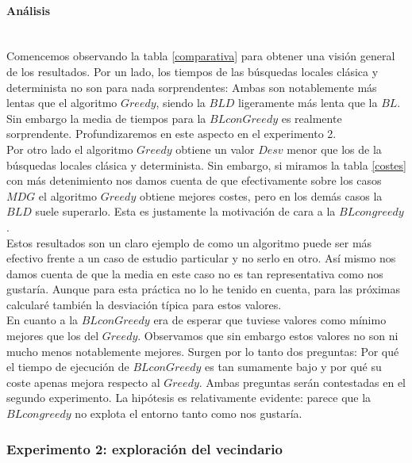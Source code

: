 \documentclass[11pt,a4paper]{article}
\begin{document}
	\paragraph{ Análisis } \ \\
	
	Comencemos observando la tabla \ref{comparativa} para obtener una visión general de los resultados. Por un lado, los tiempos de las búsquedas locales clásica y determinista no son para nada sorprendentes: Ambas son notablemente más lentas que el algoritmo $Greedy$, siendo la $BLD$ ligeramente más lenta que la $BL$. Sin embargo la media de tiempos para la $BL con Greedy$ es realmente sorprendente. Profundizaremos en este aspecto en el experimento 2.  \\
	
	Por otro lado el algoritmo $Greedy$ obtiene un valor $Desv$ menor que los de la búsquedas locales clásica y determinista. Sin embargo, si miramos la tabla \ref{costes} con más detenimiento nos damos cuenta de que efectivamente sobre los casos $MDG$ el algoritmo $Greedy$ obtiene mejores costes, pero en los demás casos la $BLD$ suele superarlo. Esta es justamente la motivación de cara a la $BL con greedy$. \\
	
	 Estos resultados son un claro ejemplo de como un algoritmo puede ser más efectivo frente a un caso de estudio particular y no serlo en otro. Así mismo nos damos cuenta de que la media en este caso no es tan representativa como nos gustaría. Aunque para esta práctica no lo he tenido en cuenta, para las próximas calcularé también la desviación típica para estos valores. \\ 
	
	En cuanto a la $BL con Greedy$ era de esperar que tuviese valores como mínimo mejores que los del $Greedy$. Observamos que sin embargo estos valores no son ni mucho menos notablemente mejores. Surgen por lo tanto dos preguntas: Por qué el tiempo de ejecución de $BL con Greedy$ es tan sumamente bajo y por qué su coste apenas mejora respecto al $Greedy$. Ambas preguntas serán contestadas en el segundo experimento. La hipótesis es relativamente evidente: parece que la $BL con greedy$ no explota el entorno tanto como nos gustaría. \\
	
	\subsubsection{ Experimento 2: exploración del vecindario }
	
\end{document}

